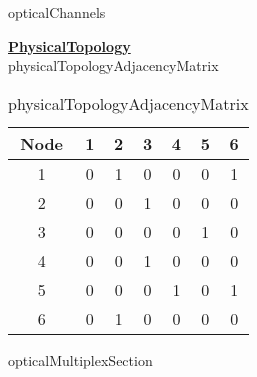 opticalChannels

\begin{table}[H]
	\centering
	\caption{opticalChannels}
	\label{optical_channels}
\end{table}

\underline{\textbf{PhysicalTopology}}\\

physicalTopologyAdjacencyMatrix

\begin{table}[H]
	\centering
	\begin{tabular}{| c | c | c | c | c | c | c |}
		\hline
		\textbf{Node} & 1 & 2 & 3 & 4 & 5 & 6 \\ \hline
		1             & 0 & 1 & 0 & 0 & 0 & 1 \\ \hline
		2             & 0 & 0 & 1 & 0 & 0 & 0 \\ \hline
		3             & 0 & 0 & 0 & 0 & 1 & 0 \\ \hline
		4			  & 0 & 0 & 1 & 0 & 0 & 0 \\ \hline	
		5    	      & 0 & 0 & 0 & 1 & 0 & 1 \\ \hline
		6			  & 0 & 1 & 0 & 0 & 0 & 0 \\ \hline
	\end{tabular}
	\caption{physicalTopologyAdjacencyMatrix}
	\label{physical_matrix}
\end{table}

opticalMultiplexSection

